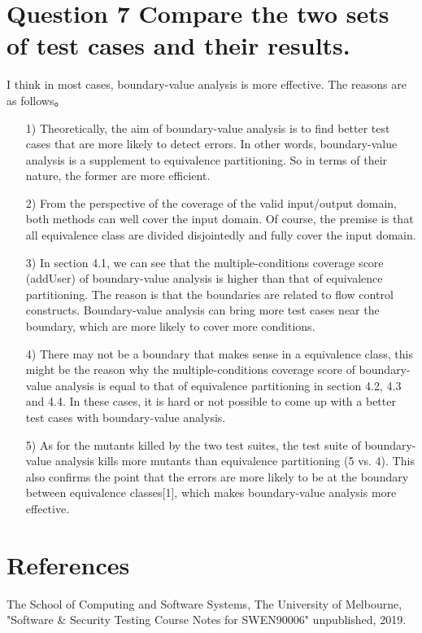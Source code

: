 \documentclass{article}
\begin{document}
\section{Question 7 Compare the two sets of test cases and their results.}
I think in most cases, boundary-value analysis is more effective. The reasons are as follows。
\begin{itemize}
\item [1)] 
Theoretically, the aim of boundary-value analysis is to find better test cases that are more likely to detect errors. In other words, boundary-value analysis is a supplement to equivalence partitioning. So in terms of their nature, the former are more efficient.
\item [2)]
From the perspective of the coverage of the valid input/output domain, both methods can well cover the input domain. Of course, the premise is that all equivalence class are divided disjointedly and fully cover the input domain.
\item [3)]
In section 4.1, we can see that the multiple-conditions coverage score (addUser) of boundary-value analysis is higher than that of equivalence partitioning. The reason is that the boundaries are related to flow control constructs. Boundary-value analysis can bring more test cases near the boundary, which are more likely to cover more conditions.
\item [4)]
There may not be a boundary that makes sense in a equivalence class, this might be the reason why the multiple-conditions coverage score of boundary-value analysis is equal to that of equivalence partitioning in section 4.2, 4.3 and 4.4. In these cases, it is hard or not possible to come up with a better test cases with boundary-value analysis.
\item [5)]
As for the mutants killed by the two test suites, the test suite of boundary-value analysis kills more mutants than equivalence partitioning (5 vs. 4). This also confirms the point that the errors are more likely to be at the boundary between equivalence classes[1], which makes boundary-value analysis more effective.
\end{itemize}

\section*{References}

\begin{enumerate}[label={[\arabic*]}, noitemsep]
\item The School of Computing and Software Systems, The University of Melbourne, "Software \& Security Testing Course Notes for SWEN90006" unpublished, 2019.
\end{enumerate}
\enddocument
\end{document}
